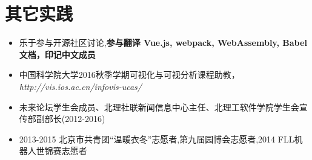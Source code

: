 \documentclass{resume}
\begin{document}


\section{其它实践}
\begin{itemize}[parsep=0.2ex]
  \item 乐于参与开源社区讨论,\textbf{参与翻译 Vue.js, webpack, WebAssembly, Babel 文档，印记中文成员}
  \item 中国科学院大学2016秋季学期可视化与可视分析课程助教，\textit{http://vis.ios.ac.cn/infovis-ucas/}
  \item 未来论坛学生会成员、北理社联新闻信息中心主任、北理工软件学院学生会宣传部副部长(2012-2016)
  \item 2013-2015 北京市共青团“温暖衣冬”志愿者,第九届园博会志愿者,2014 FLL机器人世锦赛志愿者
\end{itemize}

%
%
\end{document}
